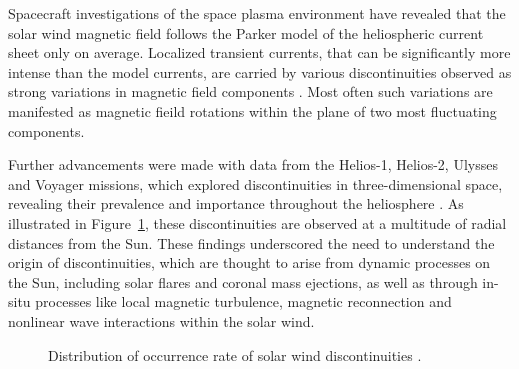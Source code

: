 \documentclass[
  letterpaper,
  DIV=11,
  numbers=noendperiod]{scrartcl}
\begin{document}
Spacecraft investigations of the space plasma environment have revealed that the solar wind magnetic field follows the Parker model of the heliospheric current sheet only on average. Localized transient currents, that can be significantly more intense than the model currents, are carried by various discontinuities observed as strong variations in magnetic field components \citep{colburnDiscontinuitiesSolarWind1966, burlagaMicroscaleStructuresInterplanetary1968, turnerOrientationsRotationalTangential1971}. Most often such variations are manifested as magnetic fieild rotations within the plane of two most fluctuating components.

Further advancements were made with data from the Helios-1, Helios-2, Ulysses and Voyager missions, which explored discontinuities in three-dimensional space, revealing their prevalence and importance throughout the heliosphere \citep{marianiStatisticalStudyMagnetohydrodynamic1983, tsurutaniNonlinearElectromagneticWaves1997}. As illustrated in Figure~\ref{fig-1}, these discontinuities are observed at a multitude of radial distances from the Sun. These findings underscored the need to understand the origin of discontinuities, which are thought to arise from dynamic processes on the Sun, including solar flares and coronal mass ejections, as well as through in-situ processes like local magnetic turbulence, magnetic reconnection and nonlinear wave interactions within the solar wind.

\begin{figure}


\caption{\label{fig-1}Distribution of occurrence rate of solar wind discontinuities \citep{sodingRadialLatitudinalDependencies2001}.}

\end{figure}%
\end{document}
